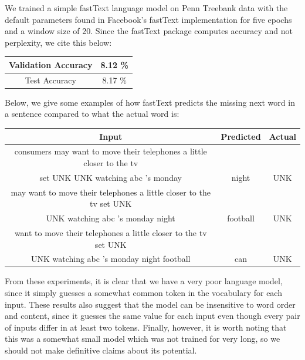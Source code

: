 \documentclass[a4paper]{article}
\begin{document}
\newline
\newline
We trained a simple fastText language model on Penn Treebank data with the default parameters found in Facebook's fastText implementation for five epochs and a window size of 20. Since the fastText package computes accuracy and not perplexity, we cite this below:

\begin{center}
\begin{tabular}{ |c|c| } 
 \hline
 Validation Accuracy & 8.12 \% \\ \hline
 Test Accuracy & 8.17 \% \\
 \hline
\end{tabular}
\end{center}

Below, we give some examples of how fastText predicts the missing next word in a sentence compared to what the actual word is:

\begin{center}
\begin{tabular}{ |c|c|c|} 
 \hline
Input & Predicted & Actual \\ \hline
consumers may want to move their telephones a little closer to the tv \\ set UNK UNK watching abc 's monday & night & UNK \\ \hline
may want to move their telephones a little closer to the tv set UNK \\ UNK watching abc 's monday night & football & UNK \\ \hline
want to move their telephones a little closer to the tv set UNK \\ UNK watching abc 's monday night football & can & UNK \\ \hline
\end{tabular}
\end{center}

From these experiments, it is clear that we have a very poor language model, since it simply guesses a somewhat common token in the vocabulary for each input. These results also suggest that the model can be insensitive to word order and content, since it guesses the same value for each input even though every pair of inputs differ in at least two tokens. Finally, however, it is worth noting that this was a somewhat small model which was not trained for very long, so we should not make definitive claims about its potential.
\end{document}
